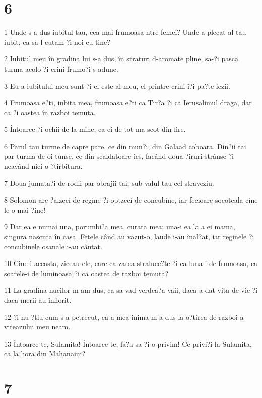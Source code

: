 \chapter{6}

\par 1 Unde s-a dus iubitul tau, cea mai frumoasa-ntre femei? Unde-a plecat al tau iubit, ca sa-l cutam ?i noi cu tine?
\par 2 Iubitul meu în gradina lui s-a dus, în straturi d-aromate pline, sa-?i pasca turma acolo ?i crini frumo?i s-adune.
\par 3 Eu a iubitului meu sunt ?i el este al meu, el printre crini î?i pa?te iezii.
\par 4 Frumoasa e?ti, iubita mea, frumoasa e?ti ca Tir?a ?i ca Ierusalimul draga, dar ca ?i oastea în razboi temuta.
\par 5 Întoarce-?i ochii de la mine, ca ei de tot ma scot din fire.
\par 6 Parul tau turme de capre pare, ce din mun?i, din Galaad coboara. Din?ii tai par turma de oi tunse, ce din scaldatoare ies, facând doua ?iruri strânse ?i neavând nici o ?tirbitura.
\par 7 Doua jumata?i de rodii par obrajii tai, sub valul tau cel straveziu.
\par 8 Solomon are ?aizeci de regine ?i optzeci de concubine, iar fecioare socoteala cine le-o mai ?ine!
\par 9 Dar ea e numai una, porumbi?a mea, curata mea; una-i ea la a ei mama, singura nascuta în casa. Fetele când au vazut-o, laude i-au înal?at, iar reginele ?i concubinele osanale i-au cântat.
\par 10 Cine-i aceasta, ziceau ele, care ca zarea straluce?te ?i ca luna-i de frumoasa, ca soarele-i de luminoasa ?i ca oastea de razboi temuta?
\par 11 La gradina nucilor m-am dus, ca sa vad verdea?a vaii, daca a dat vita de vie ?i daca merii au înflorit.
\par 12 ?i nu ?tiu cum s-a petrecut, ca a mea inima m-a dus la o?tirea de razboi a viteazului meu neam.
\par 13 Întoarce-te, Sulamita! Întoarce-te, fa?a sa ?i-o privim! Ce privi?i la Sulamita, ca la hora din Mahanaim?

\chapter{7}

